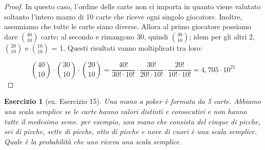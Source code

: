 \documentclass[12pt]{article}
\newtheorem{theorem}{Esercizio}
\begin{document}
\begin{proof}
In questo caso, l'ordine delle carte non ci importa in quanto viene valutato soltanto l'intero mazzo di 10 carte che riceve ogni singolo giocatore. Inoltre, assumiamo che tutte le carte siano diverse. Allora al primo giocatore possiamo dare ${40 \choose 10}$ carte; al secondo  e rimangono 30, quindi ${30 \choose 10}$; idem per gli altri 2, ${20 \choose 10}$ e ${10 \choose 10}$ = 1. Questi risultati vanno moltiplicati tra loro:

$$
{40 \choose 10} \cdot {30 \choose 10} \cdot {20 \choose 10} = 
\frac{40!}{30! \cdot 10!} \cdot \frac{30!}{20! \cdot 10!} \cdot \frac{20!}{10! \cdot 10!} = 4,705 \cdot 10^{21} 
$$

\end{proof}

\begin{theorem}[ex. Esercizio 15]
Una mano a poker è formata da 5 carte. Abbiamo una scala semplice se le carte hanno valori distinti e consecutivi e non hanno tutte il medesimo seme. per esempio, una mano che consista del cinque di picche, sei di picche, sette di picche, otto di picche e nove di cuori è una scala semplice. Quale è la probabilità che uno riceva una scala semplice.
\end{theorem}
\end{document}
